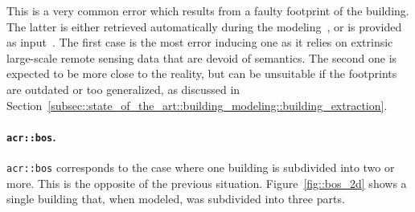                 This is a very common error which results from a faulty footprint of the building.
                The latter is either retrieved automatically during the modeling~\parencite{lafarge2012creating}, or is provided as input~\parencite{durupt2006automatic}.
                The first case is the most error inducing one as it relies on extrinsic large-scale remote sensing data that are devoid of semantics.
                The second one is expected to be more close to the reality, but can be unsuitable if the footprints are outdated or too generalized, as discussed in Section~\ref{subsec::state_of_the_art::building_modeling::building_extraction}.

            \paragraph{\texttt{\acrlong*{acr::bos}}.}
                \texttt{\gls{acr::bos}} corresponds to the case where one building is subdivided into two or more.
                This is the opposite of the previous situation.
                Figure~\ref{fig::bos_2d} shows a single building that, when modeled, was subdivided into three parts.\\

                \begin{figure}[htbp]
                    \centering
                \end{figure}

